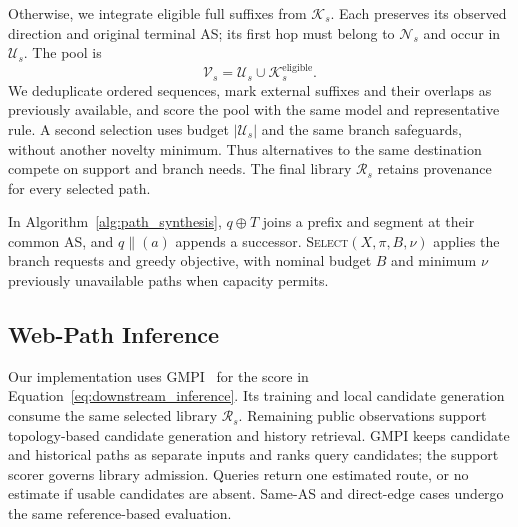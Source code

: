 Otherwise, we integrate eligible full suffixes from $\mathcal K_s$.
Each preserves its observed direction and original terminal AS; its first
hop must belong to $\mathcal N_s$ and occur in $\mathcal U_s$. The pool is
\begin{equation}
\mathcal V_s=\mathcal U_s\cup\mathcal K_s^{\mathrm{eligible}}.
\label{eq:common_pool}
\end{equation}
We deduplicate ordered sequences, mark external suffixes and their overlaps
as previously available, and score the pool with the same model and
representative rule. A second selection uses budget $|\mathcal U_s|$ and the
same branch safeguards, without another novelty minimum. Thus alternatives
to the same destination compete on support and branch needs. The final
library $\mathcal R_s$ retains provenance for every selected path.



In Algorithm~\ref{alg:path_synthesis}, $q\oplus T$ joins a prefix and
segment at their common AS, and $q\mathbin{\|}(a)$ appends a successor.
\textsc{Select}$(X,\pi,B,\nu)$ applies the branch requests and greedy
objective, with nominal budget $B$ and minimum $\nu$ previously unavailable
paths when capacity permits.

\subsection{Web-Path Inference}
\label{sec:web_queries}

Our implementation uses GMPI~\cite{li2023realizing} for the score in
Equation~\eqref{eq:downstream_inference}. Its training and local candidate
generation consume the same selected library $\mathcal R_s$. Remaining
public observations support topology-based candidate generation and
history retrieval. GMPI keeps candidate and historical paths as separate
inputs and ranks
query candidates; the support scorer governs library admission. Queries
return one estimated route, or no estimate if usable candidates are
absent. Same-AS and direct-edge cases undergo the same reference-based
evaluation.
